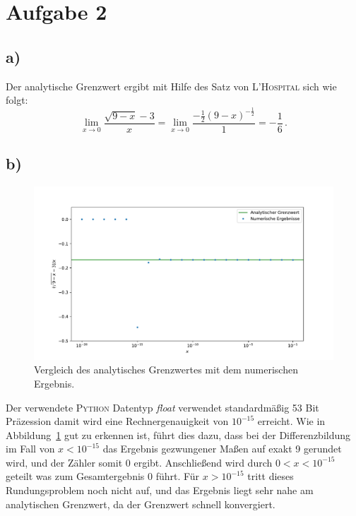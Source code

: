 \documentclass[a4paper, 11pt]{article}
\begin{document}
\FloatBarrier
\section*{Aufgabe 2}
\subsection*{a)}
Der analytische Grenzwert ergibt mit Hilfe des Satz von \textsc{L'Hospital} sich wie folgt:
\begin{equation}
    \lim_{x \to 0} \frac{\sqrt{9 - x}- 3}{x} = \lim_{x \to 0}\frac{-\frac{1}{2}(9 - x)^{-\frac{1}{2}}}{1} = -\frac{1}{6}\,.
    \label{eqn:2a}
\end{equation}

\subsection*{b)}
\begin{figure}
    \centering
    \includegraphics[width=\textwidth]{../A02/A2.pdf}
    \caption{Vergleich des analytisches Grenzwertes mit dem numerischen Ergebnis.}
    \label{fig:2b}
\end{figure}
Der verwendete \textsc{Python} Datentyp \textit{float} verwendet standardmäßig 53 Bit Präzession damit wird eine Rechnergenauigkeit von $10^{-15}$ erreicht. Wie in Abbildung~\ref{fig:2b} gut zu erkennen ist, führt dies dazu, dass bei der Differenzbildung im Fall von $x < 10^{-15}$ das Ergebnis gezwungener Maßen auf exakt 9 gerundet wird, und der Zähler somit 0 ergibt. Anschließend wird durch $0 < x < 10^{-15}$ geteilt was zum Gesamtergebnis 0 führt. Für $x > 10^{-15}$ tritt dieses Rundungsproblem noch nicht auf, und das Ergebnis liegt sehr nahe am analytischen Grenzwert, da der Grenzwert schnell konvergiert.
\end{document}
